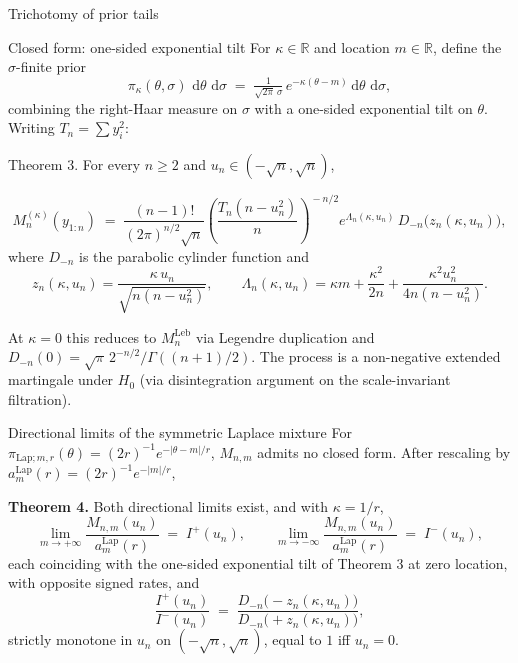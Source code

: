 \documentclass[final]{beamer}
\newcommand{\dd}{\,\mathrm{d}}
\newcommand{\Leb}{\mathrm{Leb}}
\newcommand{\Lap}{\mathrm{Lap}}
\newlength{\colwidth}
\begin{document}
\begin{frame}[t]
\begin{columns}[t]
\begin{column}{\colwidth}
\begin{block}{Trichotomy of prior tails}
\begin{center}
{\begin{tikzpicture}
\end{tikzpicture}%
}
\end{center}
 
\end{block}



  \begin{block}{Closed form: one-sided exponential tilt}
    For $\kappa\in\mathbb R$ and location $m\in\mathbb R$, define the $\sigma$-finite prior
    \[
      \pi_\kappa(\theta,\sigma)\,\dd\theta\,\dd\sigma \;=\; \tfrac{1}{\sqrt{2\pi}\,\sigma}\, e^{-\kappa(\theta-m)}\dd\theta\,\dd\sigma,
    \]
    combining the right-Haar measure on $\sigma$ with a one-sided exponential tilt on $\theta$. Writing $T_n=\sum y_i^2$:
    
      Theorem 3. For every $n\ge 2$ and $u_n\in(-\sqrt n,\sqrt n)$,
    
    \[
      M_n^{(\kappa)}(y_{1:n}) \;=\; \frac{(n-1)!}{(2\pi)^{n/2}\sqrt n}\!\left(\frac{T_n(n-u_n^2)}{n}\right)^{\!-n/2}\! e^{\Lambda_n(\kappa,u_n)}\, D_{-n}\!\bigl(z_n(\kappa,u_n)\bigr),
    \]
    where $D_{-n}$ is the parabolic cylinder function and
    \[
      z_n(\kappa,u_n) = \frac{\kappa\,u_n}{\sqrt{n(n-u_n^2)}}, \qquad
      \Lambda_n(\kappa,u_n) = \kappa m + \frac{\kappa^2}{2n} + \frac{\kappa^2 u_n^2}{4n(n-u_n^2)}.
    \]
    
    
    At $\kappa=0$ this reduces to $M_n^{\Leb}$ via Legendre duplication and $D_{-n}(0)=\sqrt\pi\,2^{-n/2}/\Gamma((n+1)/2)$. The process is a non-negative extended martingale under $H_0$ (via disintegration argument on the scale-invariant filtration).
  \end{block}

  \begin{alertblock}{Directional limits of the symmetric Laplace mixture}
    For $\pi_{\Lap;m,r}(\theta)=(2r)^{-1}e^{-|\theta-m|/r}$, $M_{n,m}$ admits no closed form. After rescaling by $a_m^{\Lap}(r)=(2r)^{-1}e^{-|m|/r}$,

    \textbf{Theorem 4.} Both directional limits exist, and with $\kappa=1/r$,
    \[
      \lim_{m\to+\infty}\frac{M_{n,m}(u_n)}{a_m^{\Lap}(r)} \;=\; I^+(u_n), \qquad
      \lim_{m\to-\infty}\frac{M_{n,m}(u_n)}{a_m^{\Lap}(r)} \;=\; I^-(u_n),
    \]
    each coinciding with the one-sided exponential tilt of Theorem 3 at zero location, with opposite signed rates, and
    \[
      \frac{I^+(u_n)}{I^-(u_n)} \;=\; \frac{D_{-n}\!\bigl(-z_n(\kappa,u_n)\bigr)}{D_{-n}\!\bigl(+z_n(\kappa,u_n)\bigr)},
    \]
    strictly monotone in $u_n$ on $(-\sqrt n,\sqrt n)$, equal to $1$ iff $u_n=0$.


\end{alertblock}
\end{column}
\end{columns}
\end{frame}
\end{document}
